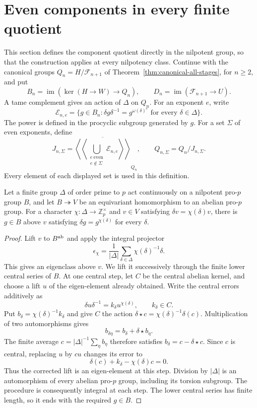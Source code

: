 \section{Even components in every finite quotient}
\label{sec:selected-all-stages}

This section defines the component quotient directly in the
nilpotent group, so that the construction applies at every
nilpotency class. Continue with the canonical groups
\(Q_n=H/\mathcal F_{n+1}\) of Theorem~\ref{thm:canonical-all-stages},
for \(n\geq2\), and put
\[
 B_n=\operatorname{im}(\ker(H\longrightarrow W)\longrightarrow Q_n),
 \qquad D_n=\operatorname{im}(\mathcal F_{n+1}\longrightarrow U).
\]
A tame complement gives an action of \(\Delta\) on \(Q_n\).
For an exponent \(e\), write
\[
 \mathcal E_{n,e}=
 \{g\in B_n:\delta g\delta^{-1}=g^{\omega(\delta)^e}
                         \text{ for every }\delta\in\Delta\}.
\]
The power is defined in the procyclic subgroup generated by \(g\).
For a set \(\Sigma\) of even exponents, define
\[
 J_{n,\Sigma}=
 \overline{\left\langle\!\left\langle
       \bigcup_{\substack{e\ \mathrm{even}\\e\notin\Sigma}}
                   \mathcal E_{n,e}
                   \right\rangle\!\right\rangle}_{Q_n},
 \qquad Q_{n,\Sigma}=Q_n/J_{n,\Sigma}.
\]
Every element of each displayed set is used in this definition.

\begin{lemma}\label{lem:tame-eigen-element-lift}
Let a finite group \(\Delta\) of order prime to \(p\) act
continuously on a nilpotent pro-\(p\) group \(B\), and let
\(B\twoheadrightarrow V\) be an equivariant homomorphism to
an abelian pro-\(p\) group. For a character
\(\chi:\Delta\to\mathbb Z_p^\times\) and
\(v\in V\) satisfying \(\delta v=\chi(\delta)v\),
there is \(g\in B\) above \(v\) satisfying
\(\delta g=g^{\chi(\delta)}\) for every \(\delta\).
\end{lemma}
\begin{proof}
Lift \(v\) to \(B^{\rm ab}\) and apply the integral projector
\[
 \epsilon_\chi=\frac1{|\Delta|}
               \sum_{\delta\in\Delta}\chi(\delta)^{-1}\delta.
\]
This gives an eigenclass above \(v\). We lift it successively
through the finite lower central series of \(B\).
At one central step, let \(C\) be the central abelian kernel,
and choose a lift \(u\) of the eigen-element already obtained.
Write the central errors additively as
\[
 \delta u\delta^{-1}=k_\delta u^{\chi(\delta)},
 \qquad k_\delta\in C.
\]
Put \(b_\delta=\chi(\delta)^{-1}k_\delta\) and give \(C\)
the action \(\delta\star c=\chi(\delta)^{-1}\delta(c)\).
Multiplication of two automorphisms gives
\[
 b_{\delta\eta}=b_\delta+\delta\star b_\eta.
\]
The finite average \(c=|\Delta|^{-1}\sum_\eta b_\eta\)
therefore satisfies \(b_\delta=c-\delta\star c\).
Since \(c\) is central, replacing \(u\) by \(cu\) changes
its error to
\[
 \delta(c)+k_\delta-\chi(\delta)c=0.
\]
Thus the corrected lift is an eigen-element at this step.
Division by \(|\Delta|\) is an automorphism of every abelian
pro-\(p\) group, including its torsion subgroup. The procedure
is consequently integral at each step. The lower central
series has finite length, so it ends with the required
\(g\in B\).
\end{proof}


